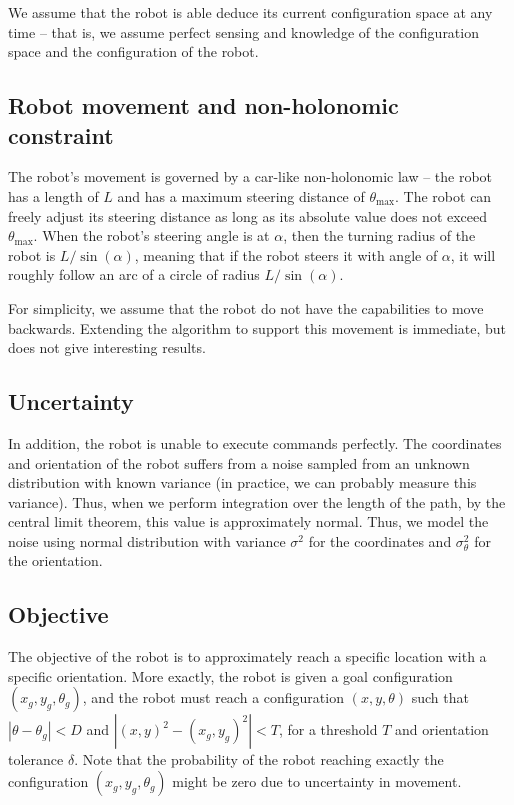 \documentclass[10pt,a4paper,oneside]{article}
\begin{document}
We assume that the robot is able deduce its current configuration space at
any time -- that is, we assume perfect sensing and knowledge of the configuration space
and the configuration of the robot.

\subsection{Robot movement and non-holonomic constraint}
The robot's movement is governed by a car-like non-holonomic law -- the robot
has a length of $L$ and has a maximum steering distance of $\theta_{\text{max}}$.
The robot can freely adjust its steering distance as long as its absolute
value does not exceed $\theta_{\text{max}}$.  When the
robot's steering angle is at $\alpha$, then the turning radius of the robot
is $L / \sin(\alpha)$, meaning that if the robot steers it with angle of $\alpha$,
it will roughly follow an arc of a circle of radius $L / \sin(\alpha)$.

For simplicity, we assume that the robot do not have the capabilities to move
backwards. Extending the algorithm to support this movement is immediate, but
does not give interesting results.

\subsection{Uncertainty}
In addition, the robot is unable to execute commands perfectly. The coordinates
and orientation of the robot suffers from a noise sampled from an unknown distribution
with known variance (in practice, we can probably measure this variance).
Thus, when we perform integration over the length of the path, by the central
limit theorem, this value is approximately normal. Thus, we model the noise
using normal distribution with variance $\sigma^2$ for the coordinates and
$\sigma_\theta^2$ for the orientation.

\subsection{Objective}
The objective of the robot is to approximately reach a specific location with a
specific orientation. More exactly, the robot is given a goal configuration
$(x_g, y_g, \theta_g)$, and the robot must reach a configuration $(x, y, \theta)$
such that $|\theta - \theta_g| < D$ and $|(x, y)^2 - (x_g, y_g)^2| < T$,
for a threshold $T$ and orientation tolerance $\delta$. Note that the probability
of the robot reaching exactly the configuration $(x_g, y_g, \theta_g)$ might be
zero due to uncertainty in movement.
\end{document}
